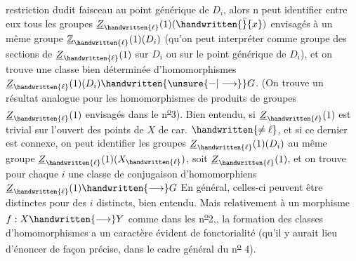 restriction dudit faisceau au  point générique de $D_i$, alors n peut identifier entre eux tous les groupes $\underline{Z}_{\handwritten{\ell}}(1)(\handwritten{\bar}{x})$ envisagés à un même groupe $\underline{\mathbb{Z}}_{\handwritten{\ell}}(1)(D_i)$ (qu'on peut interpréter comme groupe des sections de $\underline{Z}_{\handwritten{\ell}}(1)$ sur $D_i$ ou sur le point générique de $D_i$), et on trouve une classe  bien déterminée d'homomorphismes $\underline{Z}_{\handwritten{\ell}}(1)(D_i)\handwritten{\unsure{\mathbin{-}|\longrightarrow}}G$. (On trouve un résultat analogue pour les homomorphismes de produits de groupes $\underline{Z}_{\handwritten{\ell}}(1)$ envisagés dans le n\textsuperscript{\uline{o}}3). Bien entendu, si $\underline{Z}_{\handwritten{\ell}}(1)$ est trivial sur l'ouvert des points de $X$  de car. $\handwritten{\ne\ell}$, et si ce dernier est connexe, on peut identifier les groupes $\underline{Z}_{\handwritten{\ell}}(1)(D_i)$ au même groupe  $\underline{Z}_{\handwritten{\ell}}(1)(X_{\handwritten{\ell}})$,  soit $\underline{Z}_{\handwritten{\ell}}(1)$, et on trouve  pour chaque $i$ une classe de conjugaison d'homomorphiens $\underline{Z}_{\handwritten{\ell}}(1)\handwritten{\longrightarrow}G$ En général, celles-ci  peuvent être distinctes pour des $i$ distincts, bien entendu. Mais relativement à un morphisme $f:X\handwritten{\longrightarrow}Y$ comme dans les n\textsuperscript{\uline{o}}2,, la formation des classes  d'homomorphismes a un caractère évident de fonctorialité (qu'il y aurait lieu d'énoncer de façon précise, dans le cadre général du n\textsuperscript{\uline{o}} 4).


